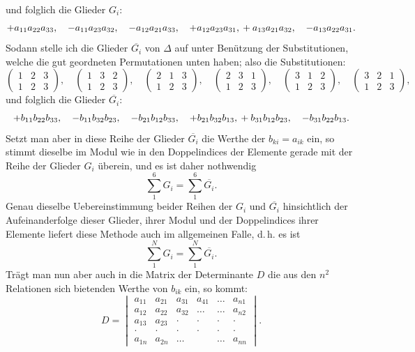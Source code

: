 \documentclass[11pt]{article}
\providecommand{\weberpage}[1]{}
\providecommand{\weq}[2]{\begin{equation}\tag{#1}#2\end{equation}}
\let\Delta\varDelta
\begin{document}
\weberpage{22}
und folglich die Glieder $G_i$:
\[
+a_{11}a_{22}a_{33}, \quad -a_{11}a_{23}a_{32}, \quad -a_{12}a_{21}a_{33}, \quad +a_{12}a_{23}a_{31},\\
+a_{13}a_{21}a_{32}, \quad -a_{13}a_{22}a_{31}.
\]
Sodann stelle ich die Glieder $\overline{G_i}$ von $\Delta$ auf unter Benützung der Substitutionen, welche die gut geordneten Permutationen unten haben; also die Substitutionen:
\[
\begin{pmatrix}1&2&3\\1&2&3\end{pmatrix}, \quad
\begin{pmatrix}1&3&2\\1&2&3\end{pmatrix}, \quad
\begin{pmatrix}2&1&3\\1&2&3\end{pmatrix}, \quad
\begin{pmatrix}2&3&1\\1&2&3\end{pmatrix}, \quad
\begin{pmatrix}3&1&2\\1&2&3\end{pmatrix}, \quad
\begin{pmatrix}3&2&1\\1&2&3\end{pmatrix},
\]
und folglich die Glieder $\overline{G_i}$:
\[
+b_{11}b_{22}b_{33}, \quad -b_{11}b_{32}b_{23}, \quad -b_{21}b_{12}b_{33}, \quad +b_{21}b_{32}b_{13},\\
+b_{31}b_{12}b_{23}, \quad -b_{31}b_{22}b_{13}.
\]
Setzt man aber in diese Reihe der Glieder $\overline{G_i}$ die Werthe der $b_{ki}=a_{ik}$ ein, so stimmt dieselbe im Modul wie in den Doppelindices der Elemente gerade mit der Reihe der Glieder $G_i$ überein, und es ist daher nothwendig
\weq{1}{\sum_1^6 G_i = \sum_1^6 \overline{G_i}.}
Genau dieselbe Uebereinstimmung beider Reihen der $G_i$ und $\overline{G_i}$ hinsichtlich der Aufeinanderfolge dieser Glieder, ihrer Modul und der Doppelindices ihrer Elemente liefert diese Methode auch im allgemeinen Falle, d.\,h. es ist
\weq{2}{\sum_1^N G_i = \sum_1^N \overline{G_i}.}
Trägt man nun aber auch in die Matrix der Determinante $D$ die aus den $n^2$ Relationen sich bietenden Werthe von $b_{ik}$ ein, so kommt:
\[
D = \begin{vmatrix}
a_{11} & a_{21} & a_{31} & a_{41} & \ldots & a_{n1}\\
a_{12} & a_{22} & a_{32} & \ldots & \ldots & a_{n2}\\
a_{13} & a_{23} & \cdot & \cdot & \cdot & \cdot\\
\cdot & \cdot & \cdot & \cdot & \cdot & \cdot\\
a_{1n} & a_{2n} & \ldots & & \ldots & a_{nn}
\end{vmatrix}.
\]
\end{document}
